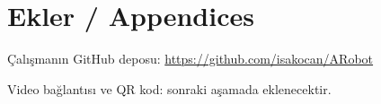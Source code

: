 \documentclass[11pt,a4paper]{article}
\begin{document}

\newpage
{}
\renewcommand{\bibname}{References / Kaynakça}



\newpage
\appendix
\section{Ekler / Appendices}
Çalışmanın GitHub deposu: \url{https://github.com/isakocan/ARobot}

Video bağlantısı ve QR kod: sonraki aşamada eklenecektir.
\end{document}

